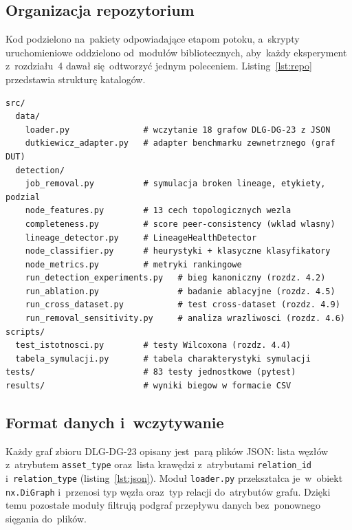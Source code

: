 \subsection{Organizacja repozytorium}

Kod podzielono na~pakiety odpowiadające etapom potoku, a~skrypty
uruchomieniowe oddzielono od~modułów bibliotecznych, aby~każdy eksperyment
z~rozdziału~4 dawał się~odtworzyć jednym poleceniem. Listing~\ref{lst:repo}
przedstawia strukturę katalogów.

\begin{lstlisting}[caption={Struktura repozytorium (fragmenty istotne
dla~detekcji węzłów).},label={lst:repo},numbers=none,language={},float=htbp]
src/
  data/
    loader.py               # wczytanie 18 grafow DLG-DG-23 z JSON
    dutkiewicz_adapter.py   # adapter benchmarku zewnetrznego (graf DUT)
  detection/
    job_removal.py          # symulacja broken lineage, etykiety, podzial
    node_features.py        # 13 cech topologicznych wezla
    completeness.py         # score peer-consistency (wklad wlasny)
    lineage_detector.py     # LineageHealthDetector
    node_classifier.py      # heurystyki + klasyczne klasyfikatory
    node_metrics.py         # metryki rankingowe
    run_detection_experiments.py   # bieg kanoniczny (rozdz. 4.2)
    run_ablation.py                # badanie ablacyjne (rozdz. 4.5)
    run_cross_dataset.py           # test cross-dataset (rozdz. 4.9)
    run_removal_sensitivity.py     # analiza wrazliwosci (rozdz. 4.6)
scripts/
  test_istotnosci.py        # testy Wilcoxona (rozdz. 4.4)
  tabela_symulacji.py       # tabela charakterystyki symulacji
tests/                      # 83 testy jednostkowe (pytest)
results/                    # wyniki biegow w formacie CSV
\end{lstlisting}

\subsection{Format danych i~wczytywanie}

Każdy graf zbioru DLG-DG-23 opisany jest~parą plików JSON: lista węzłów
z~atrybutem \texttt{asset\_type} oraz~lista krawędzi z~atrybutami
\texttt{relation\_id} i~\texttt{relation\_type} (listing~\ref{lst:json}).
Moduł \texttt{loader.py} przekształca je~w~obiekt \texttt{nx.DiGraph}
i~przenosi typ węzła oraz~typ relacji do~atrybutów grafu. Dzięki temu
pozostałe moduły filtrują podgraf przepływu danych bez~ponownego sięgania
do~plików.

